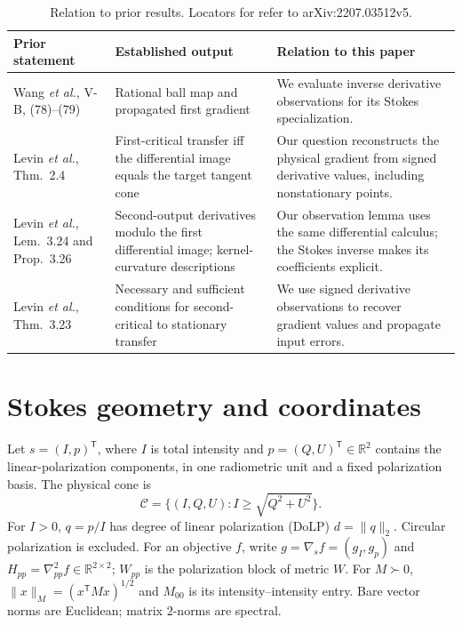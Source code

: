 \begin{table}[!t]
\caption{Relation to prior results. Locators for \cite{lifts} refer to arXiv:2207.03512v5.}
\label{tab:priorart}
\centering\small\renewcommand{\arraystretch}{1.12}
\begin{tabularx}{\textwidth}{@{}p{}p{}X@{}}\toprule
Prior statement & Established output & Relation to this paper\\\midrule
Wang \emph{et al.}, V-B, (78)--(79) \cite{gcopter} & Rational ball map and propagated first gradient & We evaluate inverse derivative observations for its Stokes specialization.\\
Levin \emph{et al.}, Thm.~2.4 \cite{lifts} & First-critical transfer iff the differential image equals the target tangent cone & Our question reconstructs the physical gradient from signed derivative values, including nonstationary points.\\
Levin \emph{et al.}, Lem.~3.24 and Prop.~3.26 \cite{lifts} & Second-output derivatives modulo the first differential image; kernel-curvature descriptions & Our observation lemma uses the same differential calculus; the Stokes inverse makes its coefficients explicit.\\
Levin \emph{et al.}, Thm.~3.23 \cite{lifts} & Necessary and sufficient conditions for second-critical to stationary transfer & We use signed derivative observations to recover gradient values and propagate input errors.\\\bottomrule
\end{tabularx}
\end{table}

\section{Stokes geometry and coordinates}
\label{sec:model}
Let $s=(I,p)^{\mathsf T}$, where $I$ is total intensity and $p=(Q,U)^{\mathsf T}\in\mathbb R^2$ contains the linear-polarization components, in one radiometric unit and a fixed polarization basis. The physical cone is
\begin{equation}
 \mathcal C=\{(I,Q,U):I\geq\sqrt{Q^2+U^2}\}.
 \label{eq:cone}
\end{equation}
For $I>0$, $q=p/I$ has degree of linear polarization (DoLP) $d=\|q\|_2$. Circular polarization is excluded. For an objective $f$, write $g=\nabla_s f=(g_I,g_p)$ and $H_{pp}=\nabla^2_{pp}f\in\mathbb R^{2\times2}$; $W_{pp}$ is the polarization block of metric $W$. For $M\succ0$, $\|x\|_M=(x^{\mathsf T}Mx)^{1/2}$ and $M_{00}$ is its intensity--intensity entry. Bare vector norms are Euclidean; matrix $2$-norms are spectral.

